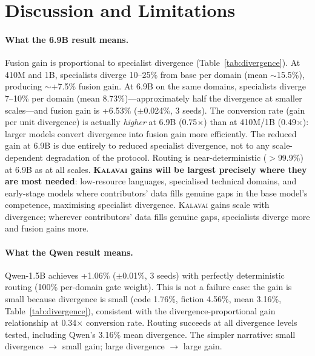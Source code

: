 \documentclass{article}
\newcommand{\kalavai}{\textsc{Kalavai}\xspace}
\begin{document}
\section{Discussion and Limitations}
\label{sec:discussion}

\paragraph{What the 6.9B result means.} Fusion gain is proportional to specialist divergence (Table~\ref{tab:divergence}). At 410M and 1B, specialists diverge 10--25\% from base per domain (mean $\sim$15.5\%), producing $\sim$+7.5\% fusion gain. At 6.9B on the same domains, specialists diverge 7--10\% per domain (mean 8.73\%)---approximately half the divergence at smaller scales---and fusion gain is +6.53\% ($\pm$0.024\%, 3 seeds). The conversion rate (gain per unit divergence) is actually \emph{higher} at 6.9B (0.75$\times$) than at 410M/1B (0.49$\times$): larger models convert divergence into fusion gain more efficiently. The reduced gain at 6.9B is due entirely to reduced specialist divergence, not to any scale-dependent degradation of the protocol. Routing is near-deterministic ($>$99.9\%) at 6.9B as at all scales. \textbf{\kalavai gains will be largest precisely where they are most needed}: low-resource languages, specialised technical domains, and early-stage models where contributors' data fills genuine gaps in the base model's competence, maximising specialist divergence. \kalavai gains scale with divergence; wherever contributors' data fills genuine gaps, specialists diverge more and fusion gains more.

\paragraph{What the Qwen result means.} Qwen-1.5B achieves +1.06\% ($\pm$0.01\%, 3 seeds) with perfectly deterministic routing (100\% per-domain gate weight). This is not a failure case: the gain is small because divergence is small (code 1.76\%, fiction 4.56\%, mean 3.16\%, Table~\ref{tab:divergence}), consistent with the divergence-proportional gain relationship at 0.34$\times$ conversion rate. Routing succeeds at all divergence levels tested, including Qwen's 3.16\% mean divergence. The simpler narrative: small divergence $\to$ small gain; large divergence $\to$ large gain.
\end{document}
